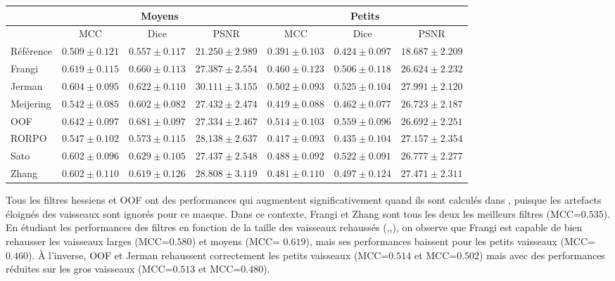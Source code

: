 \begin{table}[H]
\begin{center}
{\begin{tabular}{lccc|ccc}
                \hline
                & \multicolumn{3}{c}{Moyens}                                         & \multicolumn{3}{c}{Petits}                                            \\
                \hline
                & MCC  &  Dice & PSNR & MCC  &  Dice  &  PSNR  \\
                Référence	& $ 0.509 \pm 0.121 $ & $	0.557 \pm 0.117 $ & $ 21.250 \pm 2.989 $ & $ 0.391 \pm	0.103 $ & $	0.424 \pm 0.097 $ & $ 18.687 \pm 2.209 $ \\
                Frangi    & $ 0.619 \pm 0.115 $ & $	0.660 \pm 0.113 $ & $ 27.387 \pm 2.554 $ & $ 0.460 \pm	0.123 $ & $	0.506 \pm 0.118 $ & $ 26.624 \pm 2.232 $ \\
                Jerman    & $ 0.604 \pm 0.095 $ & $	0.622 \pm 0.110 $ & $ 30.111 \pm 3.155 $ & $ 0.502 \pm	0.093 $ & $	0.525 \pm 0.104 $ & $ 27.991 \pm 2.120 $ \\
                Meijering & $ 0.542 \pm 0.085 $ & $	0.602 \pm 0.082 $ & $ 27.432 \pm 2.474 $ & $ 0.419 \pm	0.088 $ & $	0.462 \pm 0.077 $ & $ 26.723 \pm 2.187 $ \\
                OOF	    & $ 0.642 \pm 0.097 $ & $	0.681 \pm 0.097 $ & $ 27.334 \pm 2.467 $ & $ 0.514 \pm	0.103 $ & $	0.559 \pm 0.096 $ & $ 26.692 \pm 2.251 $ \\
                RORPO	    & $ 0.547 \pm 0.102 $ & $	0.573 \pm 0.115 $ & $ 28.138 \pm 2.637 $ & $ 0.417 \pm	0.093 $ & $	0.435 \pm 0.104 $ & $ 27.157 \pm 2.354 $ \\
                Sato	    & $ 0.602 \pm 0.096 $ & $	0.629 \pm 0.105 $ & $ 27.437 \pm 2.548 $ & $ 0.488 \pm	0.092 $ & $	0.522 \pm 0.091 $ & $ 26.777 \pm 2.277 $ \\
                Zhang	    & $ 0.602 \pm 0.110 $ & $	0.619 \pm 0.126 $ & $ 28.808 \pm 3.119 $ & $ 0.481 \pm	0.110 $ & $	0.497 \pm 0.124 $ & $ 27.471 \pm 2.311 $ \\        
      \hline
      \end{tabular}

  }
  \end{center}
\end{table}


Tous les filtres hessiens et OOF ont des performances qui augmentent significativement quand ils sont calculés dans \maskvessel, puisque les artefacts éloignés des vaisseaux sont ignorés pour ce masque. Dans ce contexte, Frangi et Zhang sont tous les deux les meilleurs filtres (MCC=$0.535$). En étudiant les performances des filtres en fonction de la taille des vaisseaux rehaussés (\maskvesselLarge,\maskvesselMedium,\maskvesselSmall), on observe que Frangi est capable de bien rehausser les vaisseaux larges (MCC=$0.580$) et moyens (MCC= $0.619$), mais ses performances baissent pour les petits vaisseaux (MCC=$0.460$). À l'inverse, OOF et Jerman rehaussent correctement les petits vaisseaux (MCC=$0.514$ et MCC=$0.502$) mais avec des performances réduites sur les gros vaisseaux (MCC=$0.513$ et MCC=$0.480$).   

